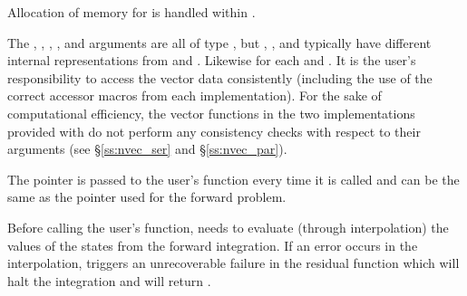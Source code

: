 {
  Allocation of memory for  is handled within {\idas}.

  The , , , , and  arguments are all 
  of type , but , , and  typically have 
  different internal representations from  and . Likewise for each
   and . It is the user's 
  responsibility to access the vector data consistently (including the use of the 
  correct accessor macros from each {\nvector} implementation). For the sake of 
  computational efficiency, the vector functions in the two {\nvector} implementations 
  provided with {\idas} do not perform any consistency checks with respect to their 
   arguments (see \S\ref{ss:nvec_ser} and \S\ref{ss:nvec_par}).

  The  pointer is passed to 
  the user's  function every time it is called and can be the same as the 
   pointer used for the forward problem.

  {\warn}Before calling the user's  function, {\idas} needs to evaluate
  (through interpolation) the values of the states from the forward integration. 
  If an error occurs in the interpolation, {\idas} triggers an unrecoverable
  failure in the residual function which will halt the integration and
   will return .
}


